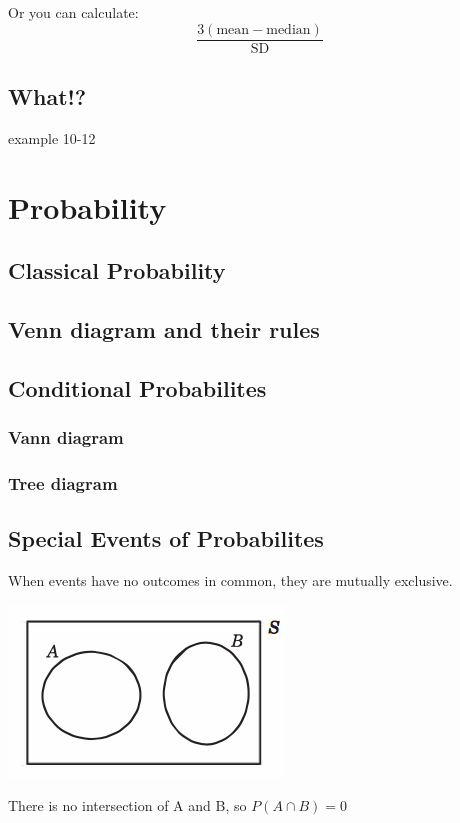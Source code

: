 \documentclass[a4paper]{article}
\begin{document}
Or you can calculate:
\[
	\frac{3(\text{mean}-\text{median})}{\text{SD}}
\]


\subsection{What!?}
\begin{eg}
	example 10-12
\end{eg}
\section{Probability}
\subsection{Classical Probability}
\subsection{Venn diagram and their rules}
\begin{defi}
\end{defi}
\subsection{Conditional Probabilites}
\subsubsection{Vann diagram}
\subsubsection{Tree diagram}
\subsection{Special Events of Probabilites}

\begin{defi}
	When events have no outcomes in common, they are mutually exclusive.
	\begin{center}
		\includegraphics[scale=0.5]{img_S/4_6_intro}
	\end{center}

\end{defi}
There is no intersection of A and B, so $P(A\cap B)=0$\\
\end{document}

